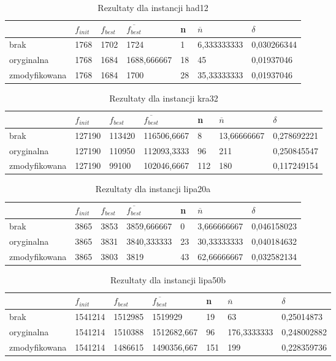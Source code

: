 \begin{table}[H]
\label{T1_had12}
\begin{tabular}{l l l l l l l}
\hline
 & $f_{init}$ & $f_{best}$ & $\overline{f_{best}}$ & n & $\overline{n}$ & $\delta$ \\
\hline
brak & 1768 & 1702 & 1724 & 1 & 6,333333333 & 0,030266344\\
oryginalna & 1768 & 1684 & 1688,666667 & 18 & 45 & 0,01937046\\
zmodyfikowana & 1768 & 1684 & 1700 & 28 & 35,33333333 & 0,01937046\\
\hline
\end{tabular}
\caption{Rezultaty dla instancji had12}
\end{table}

\begin{table}[H]
\label{T1_kra32}
\begin{tabular}{l l l l l l l}
\hline
 & $f_{init}$ & $f_{best}$ & $\overline{f_{best}}$ & n & $\overline{n}$ & $\delta$ \\
\hline
brak & 127190 & 113420 & 116506,6667 & 8 & 13,66666667 & 0,278692221\\
oryginalna & 127190 & 110950 & 112093,3333 & 96 & 211 & 0,250845547\\
zmodyfikowana & 127190 & 99100 & 102046,6667 & 112 & 180 & 0,117249154\\
\hline
\end{tabular}
\caption{Rezultaty dla instancji kra32}
\end{table}

\begin{table}[H]
\label{T1_lipa20a}
\begin{tabular}{l l l l l l l}
\hline
 & $f_{init}$ & $f_{best}$ & $\overline{f_{best}}$ & n & $\overline{n}$ & $\delta$ \\
\hline
brak & 3865 & 3853 & 3859,666667 & 0 & 3,666666667 & 0,046158023\\
oryginalna & 3865 & 3831 & 3840,333333 & 23 & 30,33333333 & 0,040184632\\
zmodyfikowana & 3865 & 3803 & 3819 & 43 & 62,66666667 & 0,032582134\\
\hline
\end{tabular}
\caption{Rezultaty dla instancji lipa20a}
\end{table}

\begin{table}[H]
\label{T1_lipa50b}
\begin{tabular}{l l l l l l l}
\hline
 & $f_{init}$ & $f_{best}$ & $\overline{f_{best}}$ & n & $\overline{n}$ & $\delta$ \\
\hline
brak & 1541214 & 1512985 & 1519929 & 19 & 63 & 0,25014873\\
oryginalna & 1541214 & 1510388 & 1512682,667 & 96 & 176,3333333 & 0,248002882\\
zmodyfikowana & 1541214 & 1486615 & 1490356,667 & 151 & 199 & 0,228359736\\
\hline
\end{tabular}
\caption{Rezultaty dla instancji lipa50b}
\end{table}

